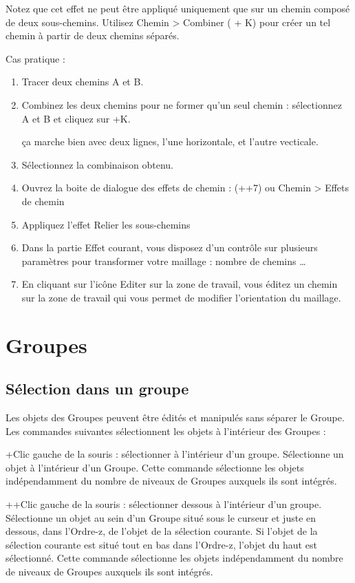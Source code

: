 \documentclass[a4paper,twoside]{article}
\begin{document}
Notez que cet effet ne peut être appliqué uniquement que sur un chemin composé de deux sous-chemins. Utilisez Chemin > Combiner ( + K) pour créer un tel chemin à partir de deux chemins séparés.

Cas pratique :
\begin{enumerate}
\item Tracer deux chemins A et B.
\item Combinez les deux chemins pour ne former qu'un seul chemin : sélectionnez A et B et cliquez sur +K.
\begin{exemple}
ça marche bien avec deux lignes, l'une horizontale, et l'autre vecticale.
\end{exemple}
\item Sélectionnez la combinaison obtenu.
\item Ouvrez la boite de dialogue des effets de chemin : (++7) ou Chemin > Effets de chemin
\item Appliquez l'effet \og Relier les sous-chemins\fg
\item Dans la partie \og Effet courant\fg , vous disposez d'un contrôle sur plusieurs paramètres pour transformer votre maillage : nombre de chemins \dots
\item En cliquant sur l'icône \og Editer sur la zone de travail\fg , vous éditez un chemin sur la zone de travail qui vous permet de modifier l'orientation du maillage.
\end{enumerate}

\section{Groupes}\label{sec:groupes}
\subsection{Sélection dans un groupe}
Les objets des Groupes peuvent être édités et manipulés sans séparer le Groupe. Les commandes suivantes sélectionnent les objets à l'intérieur des Groupes :

+Clic gauche de la souris : sélectionner à l'intérieur d'un groupe. Sélectionne un objet à l'intérieur d'un Groupe. Cette commande sélectionne les objets indépendamment du nombre de niveaux de Groupes auxquels ils sont intégrés.

++Clic gauche de la souris : sélectionner dessous à l'intérieur d'un groupe. Sélectionne un objet au sein d'un Groupe situé sous le curseur et juste en dessous, dans l'Ordre-z, de l'objet de la sélection courante. Si l'objet de la sélection courante est situé tout en bas dans l'Ordre-z, l'objet du haut est sélectionné. Cette commande sélectionne les objets indépendamment du nombre de niveaux de Groupes auxquels ils sont intégrés.
\end{document}
